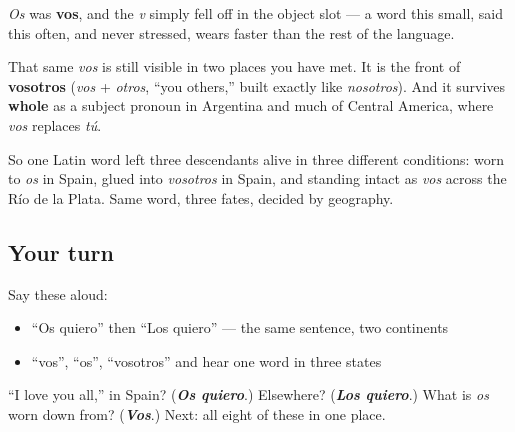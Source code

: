 \begin{cousinweb}
\emph{Os} was \textbf{vos}, and the \emph{v} simply fell off in the object slot — a word this small, said this often, and never stressed, wears faster than the rest of the language.

That same \emph{vos} is still visible in two places you have met. It is the front of \textbf{vosotros} (\emph{vos} + \emph{otros}, \textquotedblleft{}you others,\textquotedblright{} built exactly like \emph{nosotros}). And it survives \textbf{whole} as a subject pronoun in Argentina and much of Central America, where \emph{vos} replaces \emph{tú}.

So one Latin word left three descendants alive in three different conditions: worn to \emph{os} in Spain, glued into \emph{vosotros} in Spain, and standing intact as \emph{vos} across the Río de la Plata. Same word, three fates, decided by geography.
\end{cousinweb}

\subsection*{Your turn}
Say these aloud:

\begin{itemize}
\raggedright
  \item \textquotedblleft{}Os quiero\textquotedblright{} then \textquotedblleft{}Los quiero\textquotedblright{} — the same sentence, two continents
  \item \textquotedblleft{}vos\textquotedblright{}, \textquotedblleft{}os\textquotedblright{}, \textquotedblleft{}vosotros\textquotedblright{} and hear one word in three states
\end{itemize}

\begin{tcolorbox}[breakable,colback=teal!4,colframe=teal!35!black,title={Before you move on}]
\textquotedblleft{}I love you all,\textquotedblright{} in Spain? (\emph{\textbf{Os quiero}}.) Elsewhere? (\emph{\textbf{Los quiero}}.) What is \emph{os} worn down from? (\emph{\textbf{Vos}}.) Next: all eight of these in one place.
\end{tcolorbox}
